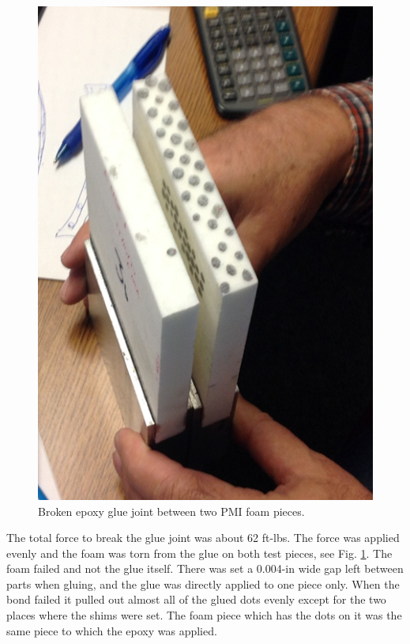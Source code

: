 \begin{figure}[ht]
    \centering
    \includegraphics[width=1.0\linewidth]{images/Broken.png}
    \caption{Broken epoxy glue joint between two PMI foam pieces.}
    \label{fig:Broken}
\end{figure}

The total force to break the glue joint  was about 62 ft-lbs. The force was applied evenly and the foam was torn from the glue on both test pieces, see Fig. \ref{fig:Broken}. The foam failed and not the glue itself. There was set a 0.004-in wide gap left between parts when gluing, and the glue was directly applied to one piece only. When the bond failed it pulled out almost all of the glued dots evenly except for the two places where the shims were set. The foam piece which has the dots on it was the same piece to which the epoxy was applied.

